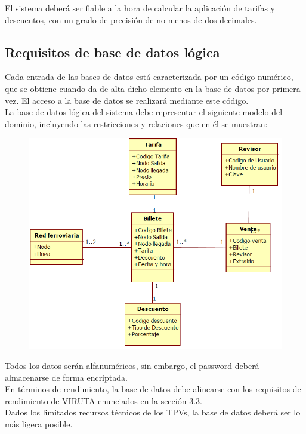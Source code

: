 El sistema deberá ser fiable a la hora de calcular la aplicación de tarifas y descuentos, con un grado de precisión de no menos de dos decimales.

\subsection{Requisitos de base de datos lógica}

Cada entrada de las bases de datos está caracterizada por un código numérico, que se obtiene cuando da de alta dicho elemento en la base de datos por primera vez. El acceso a la base de datos se realizará mediante este código.\\

La base de datos lógica del sistema debe representar el siguiente modelo del dominio, incluyendo las restricciones y relaciones que en él se muestran:\\



\begin{figure}
\centering
\includegraphics[width=0.7\linewidth]{./captura}
\label{fig:captura}
\end{figure}


Todos los datos serán alfanuméricos, sin embargo, el password deberá almacenarse de forma encriptada.\\

En términos de rendimiento, la base de datos debe alinearse con los requisitos de rendimiento de VIRUTA enunciados en la sección 3.3.\\

Dados los limitados recursos técnicos de los TPVs, la base de datos deberá ser lo más ligera posible.

